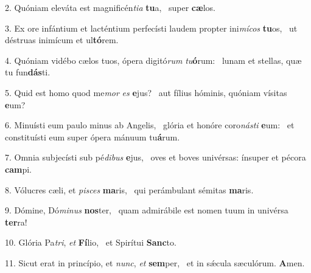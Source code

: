 2. Quóniam eleváta est magnificén\textit{ti}\textit{a} \textbf{tu}a, \ast\  super \textbf{cæ}los.\

3. Ex ore infántium et lacténtium perfecísti laudem propter ini\textit{mí}\textit{cos} \textbf{tu}os, \ast\  ut déstruas inimícum et ul\textbf{tó}rem.\

4. Quóniam vidébo cælos tuos, ópera digitó\textit{rum} \textit{tu}\textbf{ó}rum: \ast\  lunam et stellas, quæ tu fun\textbf{dás}ti.\

5. Quid est homo quod me\textit{mor} \textit{es} \textbf{e}jus? \ast\  aut fílius hóminis, quóniam vísitas \textbf{e}um?\

6. Minuísti eum paulo minus ab Angelis, \dag\  glória et honóre coro\textit{nás}\textit{ti} \textbf{e}um: \ast\  et constituísti eum super ópera mánuum tu\textbf{á}rum.\

7. Omnia subjecísti sub pé\textit{di}\textit{bus} \textbf{e}jus, \ast\  oves et boves univérsas: ínsuper et pécora \textbf{cam}pi.\

8. Vólucres cæli, et \textit{pi}\textit{sces} \textbf{ma}ris, \ast\  qui perámbulant sémitas \textbf{ma}ris.\

9. Dómine, Dó\textit{mi}\textit{nus} \textbf{nos}ter, \ast\  quam admirábile est nomen tuum in univérsa \textbf{ter}ra!\

10. Glória Pa\textit{tri}, \textit{et} \textbf{Fí}lio, \ast\  et Spirítui \textbf{Sanc}to.\

11. Sicut erat in princípio, et \textit{nunc}, \textit{et} \textbf{sem}per, \ast\  et in sǽcula sæculórum. \textbf{A}men.\

